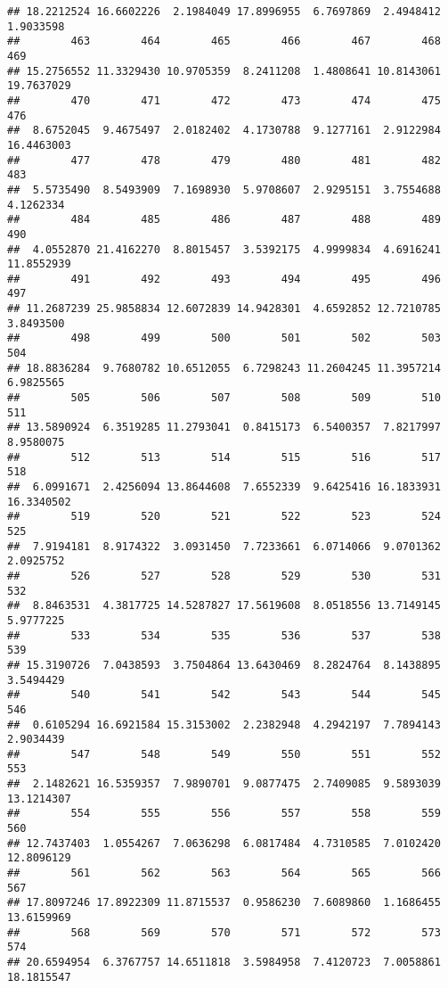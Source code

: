 \documentclass[
]{article}
\begin{document}
\begin{verbatim}
## 18.2212524 16.6602226  2.1984049 17.8996955  6.7697869  2.4948412  1.9033598 
##        463        464        465        466        467        468        469 
## 15.2756552 11.3329430 10.9705359  8.2411208  1.4808641 10.8143061 19.7637029 
##        470        471        472        473        474        475        476 
##  8.6752045  9.4675497  2.0182402  4.1730788  9.1277161  2.9122984 16.4463003 
##        477        478        479        480        481        482        483 
##  5.5735490  8.5493909  7.1698930  5.9708607  2.9295151  3.7554688  4.1262334 
##        484        485        486        487        488        489        490 
##  4.0552870 21.4162270  8.8015457  3.5392175  4.9999834  4.6916241 11.8552939 
##        491        492        493        494        495        496        497 
## 11.2687239 25.9858834 12.6072839 14.9428301  4.6592852 12.7210785  3.8493500 
##        498        499        500        501        502        503        504 
## 18.8836284  9.7680782 10.6512055  6.7298243 11.2604245 11.3957214  6.9825565 
##        505        506        507        508        509        510        511 
## 13.5890924  6.3519285 11.2793041  0.8415173  6.5400357  7.8217997  8.9580075 
##        512        513        514        515        516        517        518 
##  6.0991671  2.4256094 13.8644608  7.6552339  9.6425416 16.1833931 16.3340502 
##        519        520        521        522        523        524        525 
##  7.9194181  8.9174322  3.0931450  7.7233661  6.0714066  9.0701362  2.0925752 
##        526        527        528        529        530        531        532 
##  8.8463531  4.3817725 14.5287827 17.5619608  8.0518556 13.7149145  5.9777225 
##        533        534        535        536        537        538        539 
## 15.3190726  7.0438593  3.7504864 13.6430469  8.2824764  8.1438895  3.5494429 
##        540        541        542        543        544        545        546 
##  0.6105294 16.6921584 15.3153002  2.2382948  4.2942197  7.7894143  2.9034439 
##        547        548        549        550        551        552        553 
##  2.1482621 16.5359357  7.9890701  9.0877475  2.7409085  9.5893039 13.1214307 
##        554        555        556        557        558        559        560 
## 12.7437403  1.0554267  7.0636298  6.0817484  4.7310585  7.0102420 12.8096129 
##        561        562        563        564        565        566        567 
## 17.8097246 17.8922309 11.8715537  0.9586230  7.6089860  1.1686455 13.6159969 
##        568        569        570        571        572        573        574 
## 20.6594954  6.3767757 14.6511818  3.5984958  7.4120723  7.0058861 18.1815547 

\end{verbatim}
\end{document}
